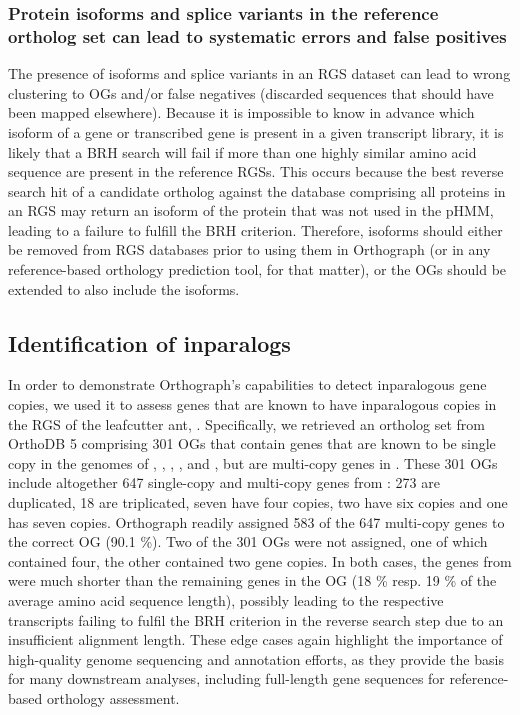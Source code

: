 \subsubsection{Protein isoforms and splice variants in the reference
ortholog set can lead to systematic errors and false
positives}\label{protein-isoforms-and-splice-variants-in-the-reference-ortholog-set-can-lead-to-systematic-errors-and-false-positives}

The presence of isoforms and splice variants in an RGS dataset can lead
to wrong clustering to OGs and/or false negatives (discarded sequences
that should have been mapped elsewhere). Because it is impossible to
know in advance which isoform of a gene or transcribed gene is present
in a given transcript library, it is likely that a BRH search will fail
if more than one highly similar amino acid sequence are present in the
reference RGSs. This occurs because the best reverse search hit of a
candidate ortholog against the database comprising all proteins in an
RGS may return an isoform of the protein that was not used in the pHMM,
leading to a failure to fulfill the BRH criterion. Therefore, isoforms
should either be removed from RGS databases prior to using them in
Orthograph (or in any reference-based orthology prediction tool, for
that matter), or the OGs should be extended to also include the
isoforms.

\subsection{Identification of
inparalogs}\label{identification-of-inparalogs}

In order to demonstrate Orthograph's capabilities to detect inparalogous
gene copies, we used it to assess genes that are known to have
inparalogous copies in the RGS of the leafcutter ant,  \cite{Suen2011}. Specifically, we retrieved an ortholog set
from OrthoDB 5 comprising 301 OGs that contain genes that are known to
be single copy in the genomes of , , , , and
, but are multi-copy genes in . These 301 OGs include altogether 647 single-copy and
multi-copy genes from : 273 are duplicated, 18
are triplicated, seven have four copies, two have six copies and one has
seven copies. Orthograph readily assigned 583 of the 647 multi-copy
genes to the correct OG (90.1 \%). Two of the 301 OGs were not assigned,
one of which contained four, the other contained two gene copies. In
both cases, the genes from  were much shorter
than the remaining genes in the OG (18 \% resp. 19 \% of the average
amino acid sequence length), possibly leading to the respective
transcripts failing to fulfil the BRH criterion in the reverse search
step due to an insufficient alignment length. These edge cases again
highlight the importance of high-quality genome sequencing and
annotation efforts, as they provide the basis for many downstream
analyses, including full-length gene sequences for reference-based
orthology assessment.

